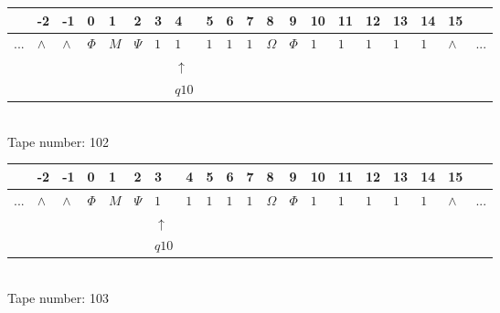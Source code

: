 \documentclass[11pt]{article}
\begin{document}
\begin{table}[H]
\centering
\begin{tabular}{llllllllllllllllllll}
 & -2 & -1 & 0 & 1 & 2 & 3 & 4 & 5 & 6 & 7 & 8 & 9 & 10 & 11 & 12 & 13 & 14 & 15 & \\
\hline
$...$ & \multicolumn{1}{|l|}{$\wedge$} & \multicolumn{1}{|l|}{$\wedge$} & \multicolumn{1}{|l|}{$\Phi$} & \multicolumn{1}{|l|}{$M$} & \multicolumn{1}{|l|}{$\Psi$} & \multicolumn{1}{|l|}{$1$} & \multicolumn{1}{|l|}{$1$} & \multicolumn{1}{|l|}{$1$} & \multicolumn{1}{|l|}{$1$} & \multicolumn{1}{|l|}{$1$} & \multicolumn{1}{|l|}{$\Omega$} & \multicolumn{1}{|l|}{$\Phi$} & \multicolumn{1}{|l|}{$1$} & \multicolumn{1}{|l|}{$1$} & \multicolumn{1}{|l|}{$1$} & \multicolumn{1}{|l|}{$1$} & \multicolumn{1}{|l|}{$1$} & \multicolumn{1}{|l|}{$\wedge$} & $...$\\
\hline
&  &  &  &  &  &  & $\uparrow$ &  &  &  &  &  &  &  &  &  &  &  &  \\
&  &  &  &  &  &  & $ q10 $ &  &  &  &  &  &  &  &  &  &  &  &  \\
\end{tabular}
\\
Tape number: 102
\noindent\makebox[\linewidth]{\hdashrule{\textwidth}{1pt}{1pt}}\end{table}

\begin{table}[H]
\centering
\begin{tabular}{llllllllllllllllllll}
 & -2 & -1 & 0 & 1 & 2 & 3 & 4 & 5 & 6 & 7 & 8 & 9 & 10 & 11 & 12 & 13 & 14 & 15 & \\
\hline
$...$ & \multicolumn{1}{|l|}{$\wedge$} & \multicolumn{1}{|l|}{$\wedge$} & \multicolumn{1}{|l|}{$\Phi$} & \multicolumn{1}{|l|}{$M$} & \multicolumn{1}{|l|}{$\Psi$} & \multicolumn{1}{|l|}{$1$} & \multicolumn{1}{|l|}{$1$} & \multicolumn{1}{|l|}{$1$} & \multicolumn{1}{|l|}{$1$} & \multicolumn{1}{|l|}{$1$} & \multicolumn{1}{|l|}{$\Omega$} & \multicolumn{1}{|l|}{$\Phi$} & \multicolumn{1}{|l|}{$1$} & \multicolumn{1}{|l|}{$1$} & \multicolumn{1}{|l|}{$1$} & \multicolumn{1}{|l|}{$1$} & \multicolumn{1}{|l|}{$1$} & \multicolumn{1}{|l|}{$\wedge$} & $...$\\
\hline
&  &  &  &  &  & $\uparrow$ &  &  &  &  &  &  &  &  &  &  &  &  &  \\
&  &  &  &  &  & $ q10 $ &  &  &  &  &  &  &  &  &  &  &  &  &  \\
\end{tabular}
\\
Tape number: 103
\noindent\makebox[\linewidth]{\hdashrule{\textwidth}{1pt}{1pt}}\end{table}
\end{document}
